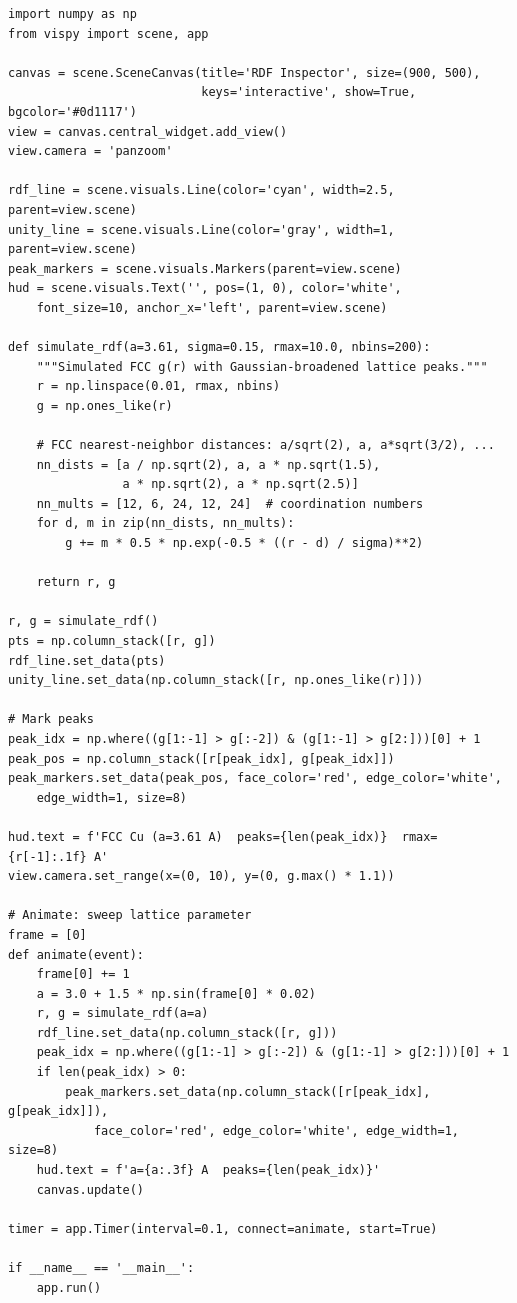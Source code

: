 \documentclass[11pt,a4paper]{article}
\begin{document}
\begin{lstlisting}[title={\textbf{Live RDF Inspection Window}}]
import numpy as np
from vispy import scene, app

canvas = scene.SceneCanvas(title='RDF Inspector', size=(900, 500),
                           keys='interactive', show=True, bgcolor='#0d1117')
view = canvas.central_widget.add_view()
view.camera = 'panzoom'

rdf_line = scene.visuals.Line(color='cyan', width=2.5, parent=view.scene)
unity_line = scene.visuals.Line(color='gray', width=1, parent=view.scene)
peak_markers = scene.visuals.Markers(parent=view.scene)
hud = scene.visuals.Text('', pos=(1, 0), color='white',
    font_size=10, anchor_x='left', parent=view.scene)

def simulate_rdf(a=3.61, sigma=0.15, rmax=10.0, nbins=200):
    """Simulated FCC g(r) with Gaussian-broadened lattice peaks."""
    r = np.linspace(0.01, rmax, nbins)
    g = np.ones_like(r)

    # FCC nearest-neighbor distances: a/sqrt(2), a, a*sqrt(3/2), ...
    nn_dists = [a / np.sqrt(2), a, a * np.sqrt(1.5),
                a * np.sqrt(2), a * np.sqrt(2.5)]
    nn_mults = [12, 6, 24, 12, 24]  # coordination numbers
    for d, m in zip(nn_dists, nn_mults):
        g += m * 0.5 * np.exp(-0.5 * ((r - d) / sigma)**2)

    return r, g

r, g = simulate_rdf()
pts = np.column_stack([r, g])
rdf_line.set_data(pts)
unity_line.set_data(np.column_stack([r, np.ones_like(r)]))

# Mark peaks
peak_idx = np.where((g[1:-1] > g[:-2]) & (g[1:-1] > g[2:]))[0] + 1
peak_pos = np.column_stack([r[peak_idx], g[peak_idx]])
peak_markers.set_data(peak_pos, face_color='red', edge_color='white',
    edge_width=1, size=8)

hud.text = f'FCC Cu (a=3.61 A)  peaks={len(peak_idx)}  rmax={r[-1]:.1f} A'
view.camera.set_range(x=(0, 10), y=(0, g.max() * 1.1))

# Animate: sweep lattice parameter
frame = [0]
def animate(event):
    frame[0] += 1
    a = 3.0 + 1.5 * np.sin(frame[0] * 0.02)
    r, g = simulate_rdf(a=a)
    rdf_line.set_data(np.column_stack([r, g]))
    peak_idx = np.where((g[1:-1] > g[:-2]) & (g[1:-1] > g[2:]))[0] + 1
    if len(peak_idx) > 0:
        peak_markers.set_data(np.column_stack([r[peak_idx], g[peak_idx]]),
            face_color='red', edge_color='white', edge_width=1, size=8)
    hud.text = f'a={a:.3f} A  peaks={len(peak_idx)}'
    canvas.update()

timer = app.Timer(interval=0.1, connect=animate, start=True)

if __name__ == '__main__':
    app.run()
\end{lstlisting}
\end{document}
